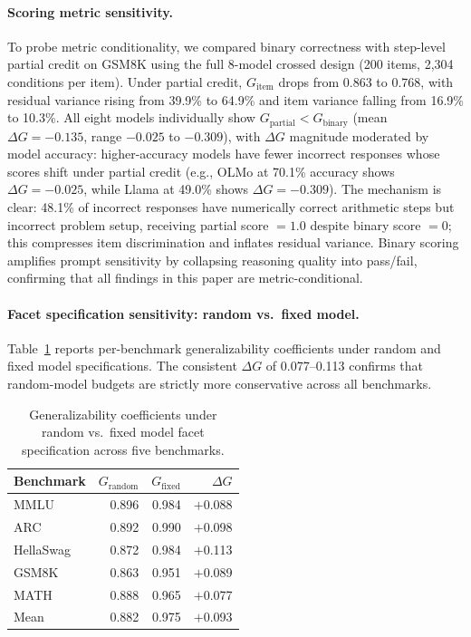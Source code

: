 \paragraph{Scoring metric sensitivity.}
\label{sec:partial_credit}
To probe metric conditionality, we compared binary correctness with step-level partial credit on GSM8K using the full 8-model crossed design (200 items, 2,304 conditions per item). Under partial credit, $G_\text{item}$ drops from 0.863 to 0.768, with residual variance rising from 39.9\% to 64.9\% and item variance falling from 16.9\% to 10.3\%. All eight models individually show $G_\text{partial} < G_\text{binary}$ (mean $\Delta G = -0.135$, range $-0.025$ to $-0.309$), with $\Delta G$ magnitude moderated by model accuracy: higher-accuracy models have fewer incorrect responses whose scores shift under partial credit (e.g., OLMo at 70.1\% accuracy shows $\Delta G = -0.025$, while Llama at 49.0\% shows $\Delta G = -0.309$). The mechanism is clear: 48.1\% of incorrect responses have numerically correct arithmetic steps but incorrect problem setup, receiving partial score $= 1.0$ despite binary score $= 0$; this compresses item discrimination and inflates residual variance. Binary scoring amplifies prompt sensitivity by collapsing reasoning quality into pass/fail, confirming that all findings in this paper are metric-conditional.

\paragraph{Facet specification sensitivity: random vs.\ fixed model.} Table~\ref{tab:fixed_vs_random} reports per-benchmark generalizability coefficients under random and fixed model specifications. The consistent $\Delta G$ of 0.077--0.113 confirms that random-model budgets are strictly more conservative across all benchmarks.

\begin{table}[h]
\centering
\caption{Generalizability coefficients under random vs.\ fixed model facet specification across five benchmarks.}
\label{tab:fixed_vs_random}
\scriptsize
\begin{tabular}{lrrr}
\toprule
Benchmark & $G_\text{random}$ & $G_\text{fixed}$ & $\Delta G$ \\
\midrule
MMLU & 0.896 & 0.984 & $+$0.088 \\
ARC & 0.892 & 0.990 & $+$0.098 \\
HellaSwag & 0.872 & 0.984 & $+$0.113 \\
GSM8K & 0.863 & 0.951 & $+$0.089 \\
MATH & 0.888 & 0.965 & $+$0.077 \\
\midrule
Mean & 0.882 & 0.975 & $+$0.093 \\
\bottomrule
\end{tabular}
\end{table}

